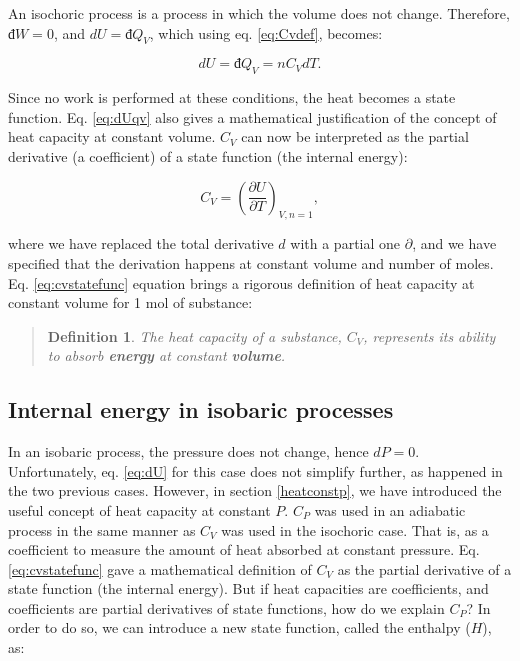 \documentclass[
  9pt,
]{extbook}
\theoremstyle{definition}
\newtheorem{definition}{Definition}[chapter]
\theoremstyle{definition}
\theoremstyle{definition}
\theoremstyle{remark}
\begin{document}
An isochoric process is a process in which the volume does not change. Therefore, \(đ W=0\), and \(dU = đ Q_V\), which using eq. \eqref{eq:Cvdef}, becomes:

\begin{equation}
  dU = đ Q_V = n C_V dT.
  \label{eq:dUqv}
\end{equation}

Since no work is performed at these conditions, the heat becomes a state function. Eq. \eqref{eq:dUqv} also gives a mathematical justification of the concept of heat capacity at constant volume. \(C_V\) can now be interpreted as the partial derivative (a coefficient) of a state function (the internal energy):

\begin{equation}
  C_V = \left( \frac{\partial U} {\partial T} \right)_{V,n=1},
  \label{eq:cvstatefunc}
\end{equation}

where we have replaced the total derivative \(d\) with a partial one \(\partial\), and we have specified that the derivation happens at constant volume and number of moles. Eq. \eqref{eq:cvstatefunc} equation brings a rigorous definition of heat capacity at constant volume for 1 mol of substance:

\begin{quote}
\begin{definition}
\protect\hypertarget{def:newdefcv}{}{\label{def:newdefcv} }\emph{The heat capacity of a substance, \(C_V\), represents its ability to absorb \textbf{energy} at constant \textbf{volume}.}
\end{definition}
\end{quote}

\hypertarget{enthalpy}{%
\subsection{Internal energy in isobaric processes}\label{enthalpy}}

In an isobaric process, the pressure does not change, hence \(dP=0\). Unfortunately, eq. \eqref{eq:dU} for this case does not simplify further, as happened in the two previous cases. However, in section \ref{heatconstp}, we have introduced the useful concept of heat capacity at constant \(P\). \(C_P\) was used in an adiabatic process in the same manner as \(C_V\) was used in the isochoric case. That is, as a coefficient to measure the amount of heat absorbed at constant pressure. Eq. \eqref{eq:cvstatefunc} gave a mathematical definition of \(C_V\) as the partial derivative of a state function (the internal energy). But if heat capacities are coefficients, and coefficients are partial derivatives of state functions, how do we explain \(C_P\)? In order to do so, we can introduce a new state function, called the enthalpy (\(H\)), as:
\end{document}
